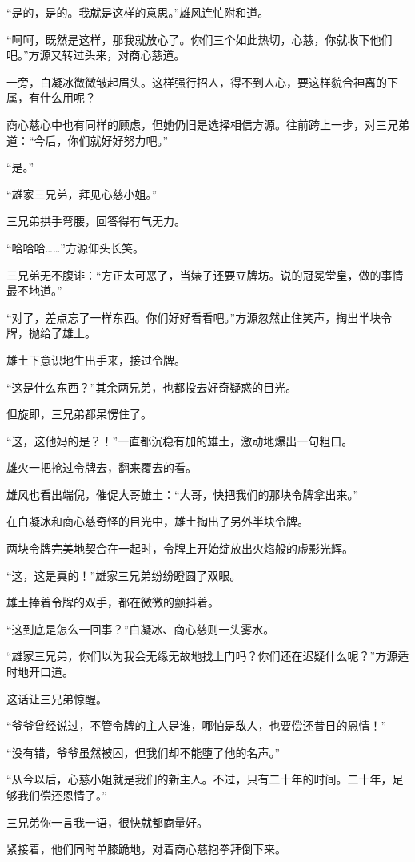 \begin{this_body}
“是的，是的。我就是这样的意思。”雄风连忙附和道。

“呵呵，既然是这样，那我就放心了。你们三个如此热切，心慈，你就收下他们吧。”方源又转过头来，对商心慈道。

一旁，白凝冰微微皱起眉头。这样强行招人，得不到人心，要这样貌合神离的下属，有什么用呢？

商心慈心中也有同样的顾虑，但她仍旧是选择相信方源。往前跨上一步，对三兄弟道：“今后，你们就好好努力吧。”

“是。”

“雄家三兄弟，拜见心慈小姐。”

三兄弟拱手弯腰，回答得有气无力。

“哈哈哈……”方源仰头长笑。

三兄弟无不腹诽：“方正太可恶了，当婊子还要立牌坊。说的冠冕堂皇，做的事情最不地道。”

“对了，差点忘了一样东西。你们好好看看吧。”方源忽然止住笑声，掏出半块令牌，抛给了雄土。

雄土下意识地生出手来，接过令牌。

“这是什么东西？”其余两兄弟，也都投去好奇疑惑的目光。

但旋即，三兄弟都呆愣住了。

“这，这他妈的是？！”一直都沉稳有加的雄土，激动地爆出一句粗口。

雄火一把抢过令牌去，翻来覆去的看。

雄风也看出端倪，催促大哥雄土：“大哥，快把我们的那块令牌拿出来。”

在白凝冰和商心慈奇怪的目光中，雄土掏出了另外半块令牌。

两块令牌完美地契合在一起时，令牌上开始绽放出火焰般的虚影光辉。

“这，这是真的！”雄家三兄弟纷纷瞪圆了双眼。

雄土捧着令牌的双手，都在微微的颤抖着。

“这到底是怎么一回事？”白凝冰、商心慈则一头雾水。

“雄家三兄弟，你们以为我会无缘无故地找上门吗？你们还在迟疑什么呢？”方源适时地开口道。

这话让三兄弟惊醒。

“爷爷曾经说过，不管令牌的主人是谁，哪怕是敌人，也要偿还昔日的恩情！”

“没有错，爷爷虽然被困，但我们却不能堕了他的名声。”

“从今以后，心慈小姐就是我们的新主人。不过，只有二十年的时间。二十年，足够我们偿还恩情了。”

三兄弟你一言我一语，很快就都商量好。

紧接着，他们同时单膝跪地，对着商心慈抱拳拜倒下来。


\end{this_body}
